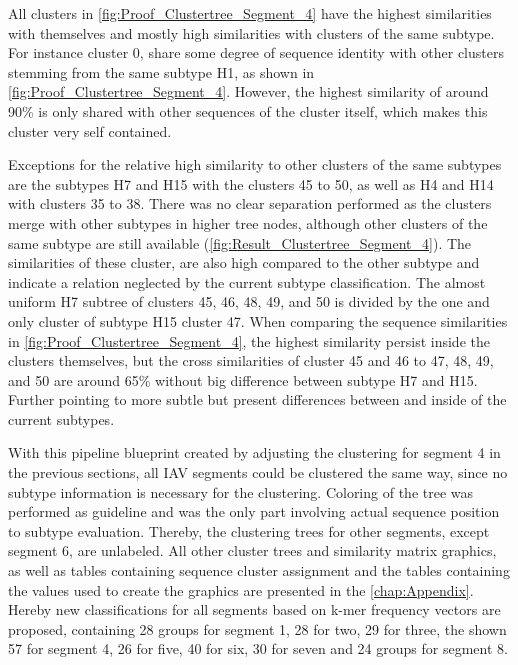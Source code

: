 All clusters in \autoref{fig:Proof_Clustertree_Segment_4} have the highest similarities with themselves and mostly high similarities with clusters of the same subtype. For instance cluster 0, share some degree of sequence identity with other clusters stemming from the same subtype H1, as shown in \autoref{fig:Proof_Clustertree_Segment_4}. However, the highest similarity of around 90\% is only shared with other sequences of the cluster itself, which makes this cluster very self contained. 

\vspace{1em}

Exceptions for the relative high similarity to other clusters of the same subtypes are the subtypes H7 and H15 with the clusters 45 to 50, as well as H4 and H14 with clusters 35 to 38. There was no clear separation performed as the clusters merge with other subtypes in higher tree nodes, although other clusters of the same subtype are still available (\autoref{fig:Result_Clustertree_Segment_4}). The similarities of these cluster, are also high compared to the other subtype and indicate a relation neglected by the current subtype classification. The almost uniform H7 subtree of clusters 45, 46, 48, 49, and 50 is divided by the one and only cluster of subtype H15 cluster 47. When comparing the sequence similarities in \autoref{fig:Proof_Clustertree_Segment_4}, the highest similarity persist inside the clusters themselves, but the cross similarities of cluster 45 and 46 to 47, 48, 49, and 50 are around 65\% without big difference between subtype H7 and H15. Further pointing to more subtle but present differences between and inside of the current subtypes. 

\vspace{1em}

With this pipeline blueprint created by adjusting the clustering for segment 4 in the previous sections, all \gls{IAV} segments could be clustered the same way, since no subtype information is necessary for the clustering. Coloring of the tree was performed as guideline and was the only part involving actual sequence position to subtype evaluation. Thereby, the clustering trees for other segments, except segment 6, are unlabeled. All other cluster trees and similarity matrix graphics, as well as tables containing sequence cluster assignment and the tables containing the values used to create the graphics are presented in the \autoref{chap:Appendix}. Hereby new classifications for all segments based on k-mer frequency vectors are proposed, containing 28 groups for segment 1, 28 for two, 29 for three, the shown 57 for segment 4, 26 for five, 40 for six, 30 for seven and 24 groups for segment 8. 

